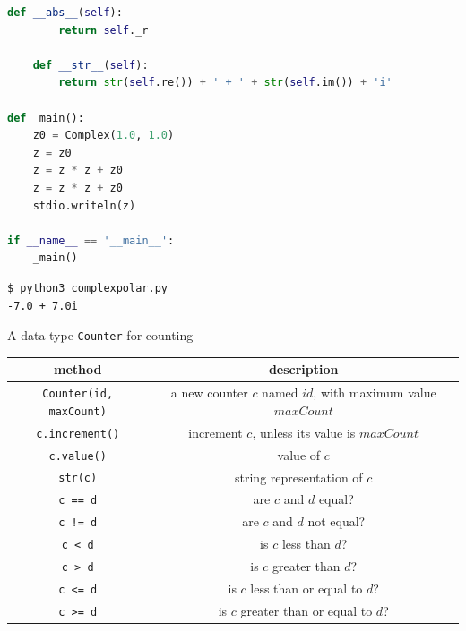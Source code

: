 \documentclass[8pt,a4paper,compress]{beamer}
\begin{document}
\begin{frame}[fragile]
\pause

\begin{lstlisting}[language=Python,style=focusin]
    def __abs__(self):
        return self._r

    def __str__(self):
        return str(self.re()) + ' + ' + str(self.im()) + 'i'

def _main():
    z0 = Complex(1.0, 1.0)
    z = z0
    z = z * z + z0
    z = z * z + z0
    stdio.writeln(z)

if __name__ == '__main__':
    _main()
\end{lstlisting}

\pause
\bigskip

\begin{lstlisting}[language={},style=focusin]
$ python3 complexpolar.py 
-7.0 + 7.0i
\end{lstlisting}
\end{frame}

\begin{frame}[fragile]
\pause

A data type \lstinline{Counter} for counting
\begin{center}
\begin{tabular}{cc}
method & description \\ \hline
\lstinline$Counter(id, maxCount)$ & a new counter $c$ named $id$, with maximum value $maxCount$ \\
\lstinline$c.increment()$ & increment $c$, unless its value is $maxCount$ \\
\lstinline$c.value()$ & value of $c$ \\
\lstinline$str(c)$ & string representation of $c$ \\
\lstinline$c == d$ & are $c$ and $d$ equal? \\
\lstinline$c != d$ & are $c$ and $d$ not equal? \\
\lstinline$c < d$ & is $c$ less than $d$? \\
\lstinline$c > d$ & is $c$ greater than $d$? \\
\lstinline$c <= d$ & is $c$ less than or equal to $d$? \\
\lstinline$c >= d$ & is $c$ greater than or equal to $d$? \\
\end{tabular} 
\end{center}
\end{frame}
\end{document}
